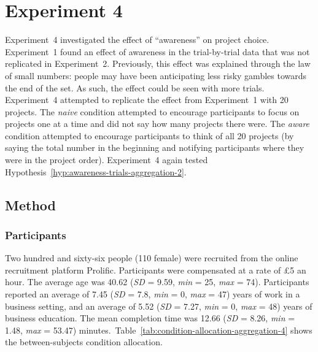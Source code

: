\documentclass[a4paper, nobind, dvipsnames]{templates/ociamthesis}
\theoremstyle{definition}
\theoremstyle{definition}
\theoremstyle{definition}
\theoremstyle{definition}
\theoremstyle{remark}
\begin{document}
\hypertarget{aggregation-4}{%
\section{Experiment 4}\label{aggregation-4}}

Experiment~4 investigated the effect of ``awareness'' on project choice.
Experiment~1 found an effect of awareness in the trial-by-trial data that was
not replicated in Experiment~2. Previously, this effect was explained through
the law of small numbers: people may have been anticipating less risky gambles
towards the end of the set. As such, the effect could be seen with more trials.
Experiment~4 attempted to replicate the effect from Experiment~1 with 20
projects. The \emph{naive} condition attempted to encourage participants to focus on
projects one at a time and did not say how many projects there were. The \emph{aware}
condition attempted to encourage participants to think of all 20 projects (by
saying the total number in the beginning and notifying participants where they
were in the project order). Experiment~4 again tested
Hypothesis~\ref{hyp:awareness-trials-aggregation-2}.

\subsection{Method}

\subsubsection{Participants}

Two hundred and sixty-six people (110 female) were recruited from the online recruitment platform Prolific. Participants were compensated at a rate of £5 an hour. The average age was 40.62 (\emph{SD} = 9.59, \emph{min} = 25, \emph{max} = 74). Participants reported an average of 7.45 (\emph{SD} = 7.8, \emph{min} = 0, \emph{max} = 47) years of work in a business setting, and an average of 5.52 (\emph{SD} = 7.27, \emph{min} = 0, \emph{max} = 48) years of business education. The mean completion time was 12.66 (\emph{SD} = 8.26, \emph{min} = 1.48, \emph{max} = 53.47) minutes.~Table~\ref{tab:condition-allocation-aggregation-4}
shows the between-subjects condition allocation.
\end{document}
